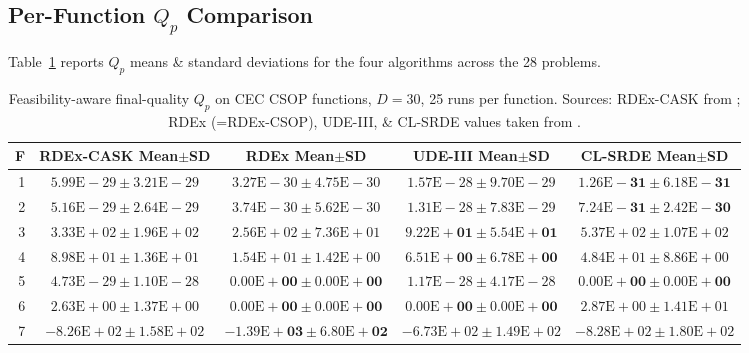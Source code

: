 \documentclass[conference]{IEEEtran}
\begin{document}
\subsection{Per-Function $Q_p$ Comparison}
Table~\ref{tab:qp} reports $Q_p$ means \& standard deviations for the four algorithms across the 28 problems.

\begin{table}[!t]
\centering
\caption{Feasibility-aware final-quality $Q_p$ on CEC CSOP functions, $D = 30$, 25 runs per function. Sources: RDEx-CASK from \cite{cask_results}; RDEx (=RDEx-CSOP), UDE-III, \& CL-SRDE values taken from \cite{tao2026rdex}.}
\label{tab:qp}
\footnotesize
\setlength{\tabcolsep}{4pt}
\begin{tabular}{rcccc}
\toprule
F & RDEx-CASK Mean$\pm$SD & RDEx Mean$\pm$SD & UDE-III Mean$\pm$SD & CL-SRDE Mean$\pm$SD \\
\midrule
1  & $5.99\mathrm{E}{-}29 \pm 3.21\mathrm{E}{-}29$ & $3.27\mathrm{E}{-}30 \pm 4.75\mathrm{E}{-}30$ & $1.57\mathrm{E}{-}28 \pm 9.70\mathrm{E}{-}29$ & $\bm{1.26\mathrm{E}{-}31 \pm 6.18\mathrm{E}{-}31}$ \\
2  & $5.16\mathrm{E}{-}29 \pm 2.64\mathrm{E}{-}29$ & $3.74\mathrm{E}{-}30 \pm 5.62\mathrm{E}{-}30$ & $1.31\mathrm{E}{-}28 \pm 7.83\mathrm{E}{-}29$ & $\bm{7.24\mathrm{E}{-}31 \pm 2.42\mathrm{E}{-}30}$ \\
3  & $3.33\mathrm{E}{+}02 \pm 1.96\mathrm{E}{+}02$ & $2.56\mathrm{E}{+}02 \pm 7.36\mathrm{E}{+}01$ & $\bm{9.22\mathrm{E}{+}01 \pm 5.54\mathrm{E}{+}01}$ & $5.37\mathrm{E}{+}02 \pm 1.07\mathrm{E}{+}02$ \\
4  & $8.98\mathrm{E}{+}01 \pm 1.36\mathrm{E}{+}01$ & $1.54\mathrm{E}{+}01 \pm 1.42\mathrm{E}{+}00$ & $\bm{6.51\mathrm{E}{+}00 \pm 6.78\mathrm{E}{+}00}$ & $4.84\mathrm{E}{+}01 \pm 8.86\mathrm{E}{+}00$ \\
5  & $4.73\mathrm{E}{-}29 \pm 1.10\mathrm{E}{-}28$ & $\bm{0.00\mathrm{E}{+}00 \pm 0.00\mathrm{E}{+}00}$ & $1.17\mathrm{E}{-}28 \pm 4.17\mathrm{E}{-}28$ & $\bm{0.00\mathrm{E}{+}00 \pm 0.00\mathrm{E}{+}00}$ \\
6  & $2.63\mathrm{E}{+}00 \pm 1.37\mathrm{E}{+}00$ & $\bm{0.00\mathrm{E}{+}00 \pm 0.00\mathrm{E}{+}00}$ & $\bm{0.00\mathrm{E}{+}00 \pm 0.00\mathrm{E}{+}00}$ & $2.87\mathrm{E}{+}00 \pm 1.41\mathrm{E}{+}01$ \\
7  & $-8.26\mathrm{E}{+}02 \pm 1.58\mathrm{E}{+}02$ & $\bm{-1.39\mathrm{E}{+}03 \pm 6.80\mathrm{E}{+}02}$ & $-6.73\mathrm{E}{+}02 \pm 1.49\mathrm{E}{+}02$ & $-8.28\mathrm{E}{+}02 \pm 1.80\mathrm{E}{+}02$ \\

\end{tabular}
\end{table}
\end{document}
